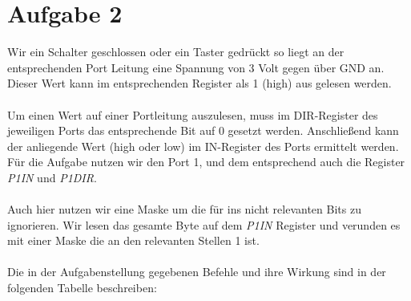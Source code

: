 


\section*{Aufgabe 2}

Wir ein Schalter geschlossen oder ein Taster gedrückt so liegt an der entsprechenden Port Leitung eine Spannung von 3 Volt gegen über GND an. Dieser Wert kann im entsprechenden Register als 1 (high) aus gelesen werden.
\paragraph*{}
Um einen Wert auf einer Portleitung auszulesen, muss im DIR-Register des jeweiligen Ports das entsprechende Bit auf 0 gesetzt werden. Anschließend kann der anliegende Wert (high oder low) im IN-Register des Ports ermittelt werden. Für die Aufgabe nutzen wir den Port 1, und dem entsprechend auch die Register {\em P1IN} und {\em P1DIR}.
\paragraph{}
Auch hier nutzen wir eine Maske um die für ins nicht relevanten Bits zu ignorieren. Wir lesen das gesamte Byte auf dem {\em P1IN} Register und verunden es mit einer Maske die an den relevanten Stellen 1 ist.
\paragraph{} Die in der Aufgabenstellung gegebenen Befehle und 
ihre Wirkung sind in der folgenden Tabelle beschreiben:

